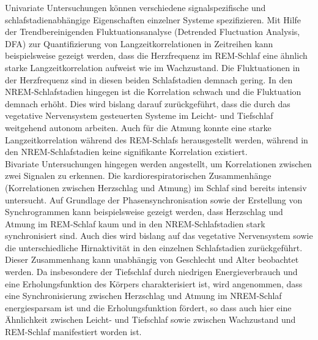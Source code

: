 Univariate Untersuchungen können verschiedene signalspezifische und schlafstadienabhängige Eigenschaften einzelner Systeme spezifizieren. Mit Hilfe der Trendbereinigenden Fluktuationsanalyse (Detrended Fluctuation Analysis, DFA) zur Quantifizierung von Langzeitkorrelationen in Zeitreihen kann beispielsweise gezeigt werden, dass die Herzfrequenz im \acs{REM}-Schlaf eine ähnlich starke Langzeitkorrelation aufweist wie im Wachzustand. Die Fluktuationen in der Herzfrequenz sind in diesen beiden Schlafstadien demnach gering. In den \acs{NREM}-Schlafstadien hingegen ist die Korrelation schwach und die Fluktuation demnach erhöht. Dies wird bislang darauf zurückgeführt, dass die durch das vegetative Nervensystem gesteuerten Systeme im Leicht- und Tiefschlaf weitgehend autonom arbeiten. Auch für die Atmung konnte eine starke Langzeitkorrelation während des \acs{REM}-Schlafs herausgestellt werden, während in den \acs{NREM}-Schlafstadien keine signifikante Korrelation existiert. \parencite{penzel_cardiovascular_2007}\\

Bivariate Untersuchungen hingegen werden angestellt, um Korrelationen zwischen zwei Signalen zu erkennen. Die kardiorespiratorischen Zusammenhänge (Korrelationen zwischen Herzschlag und Atmung) im Schlaf sind bereits intensiv untersucht. Auf Grundlage der Phasensynchronisation sowie der Erstellung von Synchrogrammen kann beispielsweise gezeigt werden, dass Herzschlag und Atmung im \acs{REM}-Schlaf kaum und in den \acs{NREM}-Schlafstadien stark synchronisiert sind. Auch dies wird bislang auf das vegetative Nervensystem sowie die unterschiedliche Hirnaktivität in den einzelnen Schlafstadien zurückgeführt. Dieser Zusammenhang kann unabhängig von Geschlecht und Alter beobachtet werden. Da insbesondere der Tiefschlaf durch niedrigen Energieverbrauch und eine Erholungsfunktion des Körpers charakterisiert ist, wird angenommen, dass eine Synchronisierung zwischen Herzschlag und Atmung im \acs{NREM}-Schlaf energiesparsam ist und die Erholungsfunktion fördert, so dass auch hier eine Ähnlichkeit zwischen Leicht- und Tiefschlaf sowie zwischen Wachzustand und \acs{REM}-Schlaf manifestiert worden ist. \parencite{penzel_cardiovascular_2007, hamann_automated_2009, bartsch_experimental_2007}\\

